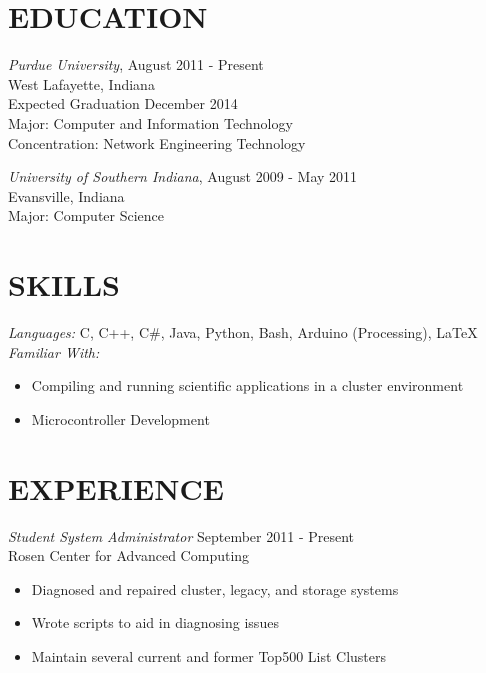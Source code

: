 \documentclass[line,margin]{res}
\begin{document}
\address{maddene@purdue.edu}
\address{(812) 250-1419}
 
\begin{resume}
\section{EDUCATION} 

				{\sl Purdue University}, \hfill August 2011 - Present \\
                West Lafayette, Indiana \\
                Expected Graduation December 2014 \\
                Major: Computer and Information Technology \\
                Concentration: Network Engineering Technology 
                
        {\sl University of Southern Indiana}, \hfill August 2009 - May 2011 \\
                Evansville, Indiana \\
                Major: Computer Science
                
 
\section{SKILLS} 
				{\sl Languages:}  C, C++, C\#, Java, Python, Bash, Arduino (Processing), \LaTeX \\
				{\sl Familiar With:} 
                \begin{itemize} \itemsep -2pt %
                  \item Compiling and running scientific applications in a cluster environment
                  \item Microcontroller Development
                \end{itemize}
 
\section{EXPERIENCE} 
				{\sl Student System Administrator} \hfill September 2011 - Present \\
                Rosen Center for Advanced Computing
                \begin{itemize}  \itemsep -2pt %
                  \item Diagnosed and repaired cluster, legacy, and storage systems
                  \item Wrote scripts to aid in diagnosing issues
                  \item Maintain several current and former Top500 List Clusters
                \end{itemize}


\end{resume}
\end{document}
